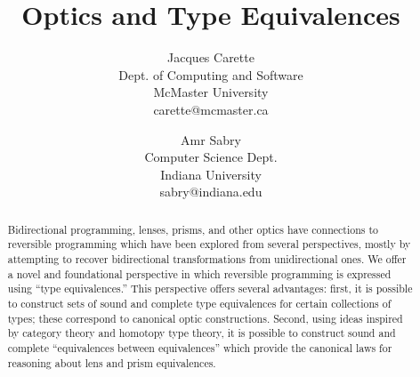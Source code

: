 \documentclass[sigplan,review,anonymous]{acmart}
\title{Optics and Type Equivalences}
\author{
Jacques Carette\\ Dept. of Computing and Software\\
        McMaster University \\ carette@mcmaster.ca
\and
Amr Sabry \\ Computer Science Dept.\\
        Indiana University \\ sabry@indiana.edu
}
\begin{document}
\maketitle

\begin{abstract}
Bidirectional programming, lenses, prisms, and other optics have connections
to reversible programming which have been explored from several perspectives,
mostly by attempting to recover bidirectional transformations from unidirectional
ones. We offer a novel and foundational perspective in which reversible programming
is expressed using “type equivalences.” This perspective offers several advantages:
first, it is possible to construct sets of sound and complete type equivalences
for certain collections of types; these correspond to canonical optic constructions.
Second, using ideas inspired by category theory and homotopy type theory,
it is possible to construct sound and complete “equivalences between equivalences”
which provide the canonical laws for reasoning about lens and prism equivalences.
\end{abstract}
\vskip 32pt
\end{document}
